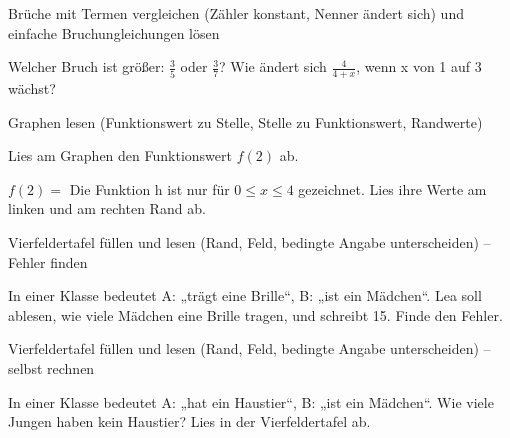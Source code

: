 \begin{aufgabe}{Brüche mit Termen vergleichen (Zähler konstant, Nenner ändert sich) und einfache Bruchungleichungen lösen}
\begin{teile}
\teil Welcher Bruch ist größer: $\frac{3}{5}$ oder $\frac{3}{7}$? \leerfeld
\teil Wie ändert sich $\frac{4}{4 + x}$, wenn x von 1 auf 3 wächst? \leerfeld
\end{teile}
\end{aufgabe}

\begin{aufgabe}{Graphen lesen (Funktionswert zu Stelle, Stelle zu Funktionswert, Randwerte)}
\begin{teile}
\teil Lies am Graphen den Funktionswert $f(2)$ ab.

\begin{ksys}[xmin=0,xmax=6,ymin=0,ymax=5,ablesen]  \end{ksys}
$f(2) =$ \leerfeld
\teil Die Funktion h ist nur für $0 \le x \le 4$ gezeichnet. Lies ihre Werte am linken und am rechten Rand ab.

\begin{ksys}[xmin=0,xmax=4,ymin=0,ymax=5,ablesen]  \end{ksys}
\leerfeld \quad \leerfeld
\end{teile}
\end{aufgabe}

\begin{aufgabe}{Vierfeldertafel füllen und lesen (Rand, Feld, bedingte Angabe unterscheiden) – Fehler finden}
\begin{teile}
\teil In einer Klasse bedeutet A: „trägt eine Brille“, B: „ist ein Mädchen“. Lea soll ablesen, wie viele Mädchen eine Brille tragen, und schreibt 15. Finde den Fehler.

\end{teile}
\end{aufgabe}

\begin{aufgabe}{Vierfeldertafel füllen und lesen (Rand, Feld, bedingte Angabe unterscheiden) – selbst rechnen}
\begin{teile}
\teil In einer Klasse bedeutet A: „hat ein Haustier“, B: „ist ein Mädchen“. Wie viele Jungen haben kein Haustier? Lies in der Vierfeldertafel ab.

\leerfeld
\end{teile}
\end{aufgabe}
